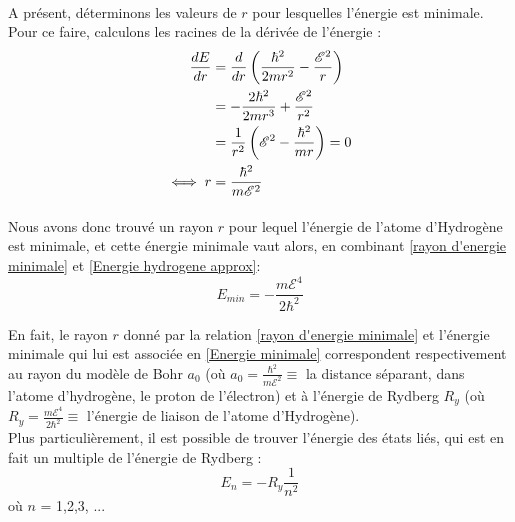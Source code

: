 \documentclass[../Notes de cours]{subfiles}
\begin{document}
\paragraph{} A présent, déterminons les valeurs de $r$ pour lesquelles l'énergie est minimale. Pour ce faire, calculons les racines de la dérivée de l'énergie :
\begin{align}
\label{rayon d'energie minimale}
\frac{dE}{dr} &= \frac{d}{dr} \left( \frac{\hbar^2}{2mr^2} - \frac{\mathcal{E}^2}{r} \right) \notag \\
&= - \frac{2\hbar^2}{2mr^3} + \frac{\mathcal{E}^2}{r^2} \notag \\
&= \frac{1}{r^2} \left( \mathcal{E}^2 - \frac{\hbar^2}{mr} \right) = 0 \notag \\
\iff r&= \frac{\hbar^2}{m\mathcal{E}^2}
\end{align}

\paragraph{} Nous avons donc trouvé un rayon $r$ pour lequel l'énergie de l'atome d'Hydrogène est minimale, et cette énergie minimale vaut alors, en combinant \ref{rayon d'energie minimale} et \ref{Energie hydrogene approx}: \begin{equation}
    \label{Energie minimale}
    E_{min} = - \frac{m\mathcal{E}^4}{2 \hbar^2}
\end{equation}

En fait, le rayon $r$ donné par la relation \ref{rayon d'energie minimale} et l'énergie minimale qui lui est associée en \ref{Energie minimale} correspondent respectivement au rayon du modèle de Bohr $a_0$ (où $a_0 = \frac{\hbar^2}{m\mathcal{E}^2} \equiv$ la distance séparant, dans l'atome d'hydrogène, le proton de l'électron) et à l'énergie de Rydberg $R_y$ (où $R_y = \frac{m\mathcal{E}^4}{2\hbar^2} \equiv$ l'énergie de liaison de l'atome d'Hydrogène). \\

Plus particulièrement, il est possible de trouver l'énergie des états liés, qui est en fait un multiple de l'énergie de Rydberg :
\begin{equation}
\label{Etats liés}
E_n = - R_y \frac{1}{n^2}
\end{equation}
où $n$ = 1,2,3, ...

\end{document}
